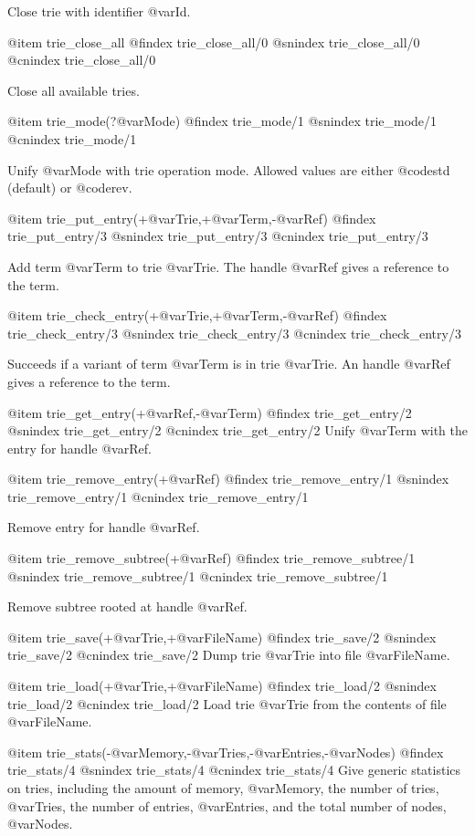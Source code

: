 {{{{{{{{{Close trie with identifier @var{Id}.

@item trie_close_all
@findex trie_close_all/0
@snindex trie_close_all/0
@cnindex trie_close_all/0

Close all available tries.

@item trie_mode(?@var{Mode})
@findex trie_mode/1
@snindex trie_mode/1
@cnindex trie_mode/1

Unify @var{Mode} with trie operation mode. Allowed values are either
@code{std} (default) or @code{rev}.

@item trie_put_entry(+@var{Trie},+@var{Term},-@var{Ref})
@findex trie_put_entry/3
@snindex trie_put_entry/3
@cnindex trie_put_entry/3

Add term @var{Term} to trie @var{Trie}. The handle @var{Ref} gives
a reference to the term.

@item trie_check_entry(+@var{Trie},+@var{Term},-@var{Ref})
@findex trie_check_entry/3
@snindex trie_check_entry/3
@cnindex trie_check_entry/3

Succeeds if a variant of term @var{Term} is in trie @var{Trie}. An handle
 @var{Ref} gives a reference to the term.

@item trie_get_entry(+@var{Ref},-@var{Term})
@findex trie_get_entry/2
@snindex trie_get_entry/2
@cnindex trie_get_entry/2
Unify @var{Term} with the entry for handle @var{Ref}.

@item trie_remove_entry(+@var{Ref})
@findex trie_remove_entry/1
@snindex trie_remove_entry/1
@cnindex trie_remove_entry/1

Remove entry for handle @var{Ref}.

@item trie_remove_subtree(+@var{Ref})
@findex trie_remove_subtree/1
@snindex trie_remove_subtree/1
@cnindex trie_remove_subtree/1

Remove subtree rooted at handle @var{Ref}.

@item trie_save(+@var{Trie},+@var{FileName})
@findex trie_save/2
@snindex trie_save/2
@cnindex trie_save/2
Dump trie @var{Trie} into file @var{FileName}.


@item trie_load(+@var{Trie},+@var{FileName})
@findex trie_load/2
@snindex trie_load/2
@cnindex trie_load/2
Load trie @var{Trie} from the contents of file @var{FileName}.

@item trie_stats(-@var{Memory},-@var{Tries},-@var{Entries},-@var{Nodes})
@findex trie_stats/4
@snindex trie_stats/4
@cnindex trie_stats/4
Give generic statistics on tries, including the amount of memory,
@var{Memory}, the number of tries, @var{Tries}, the number of entries,
@var{Entries}, and the total number of nodes, @var{Nodes}.

}}}}}}}}}
